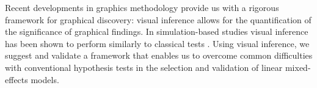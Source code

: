 \documentclass[12pt]{article} %
\newcommand{\alnote}[1]{\todo[inline,color=green!40]{#1}} %
\begin{document}
Recent developments in graphics methodology provide us with a rigorous framework for graphical discovery: visual inference  \citep{Buja:2009hp}  allows for the quantification of the significance of graphical findings. In simulation-based studies visual inference has been shown to perform similarly to classical tests  \citep{mahbub:2013}. Using visual inference, we suggest and validate a framework
 that enables us 
 to overcome common difficulties  with conventional hypothesis tests 
 in the selection and validation of linear mixed-effects models. 




\end{document}
